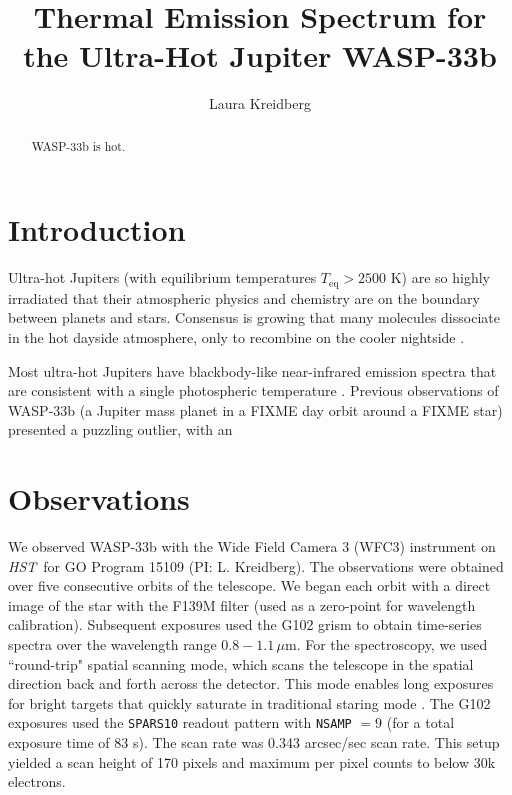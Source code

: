 \documentclass[twocolumn]{aastex62}
\newcommand{\project}[1]{\textsl{#1}}
\newcommand{\HST}{\project{HST}}
\begin{document}
\title{Thermal Emission Spectrum for the Ultra-Hot Jupiter WASP-33b }

\author{Laura Kreidberg}

\begin{abstract}
WASP-33b is hot.
\end{abstract}


\section{Introduction} \label{sec:intro}
Ultra-hot Jupiters (with equilibrium temperatures $T_\mathrm{eq} > 2500$ K) are so highly irradiated that their atmospheric physics and chemistry are on the boundary between planets and stars. Consensus is growing that many molecules dissociate in the hot dayside atmosphere, only to recombine on the cooler nightside \citep{arcangeli18, parmentier18, lothringer18}. 

Most ultra-hot Jupiters have blackbody-like near-infrared emission spectra that are consistent with a single photospheric temperature \citep{arcangeli18, kreidberg18b, mansfield18}.
Previous observations of WASP-33b (a Jupiter mass planet in a FIXME day orbit around a FIXME star) presented a puzzling outlier, with an 

\section{Observations} \label{sec:observations}
We observed WASP-33b with the Wide Field Camera 3 (WFC3) instrument on \HST\ for GO Program 15109 (PI: L. Kreidberg). The observations were obtained over five consecutive orbits of the telescope. We began each orbit with a direct image of the star with the F139M filter (used as a zero-point for wavelength calibration). Subsequent exposures used the G102 grism to obtain time-series spectra over the wavelength range $0.8 - 1.1\,\mu$m. For the spectroscopy, we used ``round-trip" spatial scanning mode, which scans the telescope in the spatial direction back and forth across the detector. This mode enables long exposures for bright targets that quickly saturate in traditional staring mode \citep[compare][]{berta12, kreidberg14a}.  The G102 exposures used the \texttt{SPARS10} readout pattern with \texttt{NSAMP} $= 9$ (for a total exposure time of 83 s). The scan rate was 0.343 arcsec/sec scan rate. This setup yielded a scan height of 170 pixels and maximum per pixel counts to below 30k electrons. 
\end{document}
